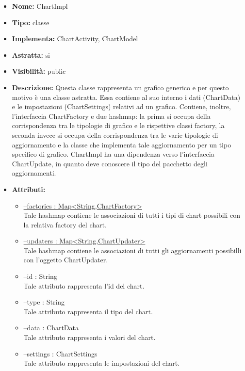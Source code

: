 			
			\begin{itemize}
			\item \textbf{Nome:} ChartImpl
			\item \textbf{Tipo:} classe
			
		\item \textbf{Implementa:}
		ChartActivity, ChartModel
		\item \textbf{Astratta:}
		si
			\item \textbf{Visibilità:} public
			\item \textbf{Descrizione:} Questa classe rappresenta un grafico generico e per questo motivo è una classe astratta. Essa contiene al suo interno i dati (ChartData) e le impostazioni (ChartSettings) relativi ad un grafico. Contiene, inoltre, l'interfaccia ChartFactory e due hashmap: la prima si occupa della corrispondenza tra le tipologie di grafico e le rispettive classi factory, la seconda invece si occupa della corrispondenza tra le varie tipologie di aggiornamento e la classe che implementa tale aggiornamento per un tipo specifico di grafico. ChartImpl ha una dipendenza verso l'interfaccia ChartUpdate, in quanto deve conoscere il tipo del pacchetto degli aggiornamenti. 
			\item \textbf{Attributi:}
				\begin{itemize}
				\setlength{\itemsep}{5pt}
				
					\item[\ding{111}] \underline{--factories : Map<String,ChartFactory>} \\ [1mm] Tale hashmap contiene le associazioni di tutti i tipi di chart possibili con la relativa factory del chart.
					\item[\ding{111}] \underline{--updaters : Map<String,ChartUpdater>} \\ [1mm] Tale hashmap contiene le associazioni di tutti gli aggiornamenti possibilli con l'oggetto ChartUpdater.
					\item[\ding{111}] {--id : String} \\ [1mm] Tale attributo rappresenta l'id del chart.
					\item[\ding{111}] {--type : String} \\ [1mm] Tale attributo rappresenta il tipo del chart.
					\item[\ding{111}] {--data : ChartData} \\ [1mm] Tale attributo rappresenta i valori del chart.
					\item[\ding{111}] {--settings : ChartSettings} \\ [1mm] Tale attributo rappresenta le impostazioni del chart.
				\end{itemize}
		

\end{itemize}
